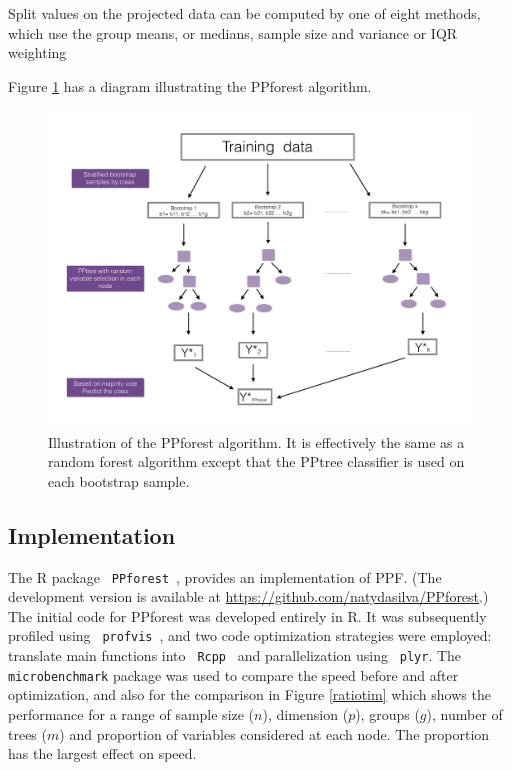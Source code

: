\documentclass[12pt]{article}\usepackage[]{graphicx}\usepackage[]{color}
\begin{document}
Split values on the projected data can be computed by one of eight methods, which use the group means, or medians, sample size and variance or IQR weighting

Figure \ref{diagppf} has a diagram illustrating the PPforest algorithm.

\begin{figure}[!ht]
\centering
\includegraphics[width=1\linewidth]{diagram.pdf}
 \vspace*{-0.5cm}
\caption{Illustration of the PPforest algorithm. It is effectively the same as a random forest algorithm except that the PPtree classifier is used on each bootstrap sample. \label{diagppf}}
\end{figure}

\subsection{Implementation}
\label{impl}

The R package \verb# PPforest#~\citep{PPforestpkg}, provides an implementation of PPF. (The development version is available at \url{https://github.com/natydasilva/PPforest}.) 
The initial code for PPforest was developed entirely in R. It was subsequently profiled using \verb# profvis#~\citep{profvis}, and two code optimization strategies were employed: translate main functions into \verb# Rcpp#~\citep{eddelbuettel2011rcpp} and parallelization  using \verb# plyr#. The \verb# microbenchmark# package was used to compare the speed before and after optimization, and also for the comparison in Figure \ref{ratiotim} which shows the performance for a range of sample size ($n$), dimension ($p$), groups ($g$), number of trees ($m$) and proportion of variables considered at each node. The proportion has the largest effect on speed.
\end{document}
